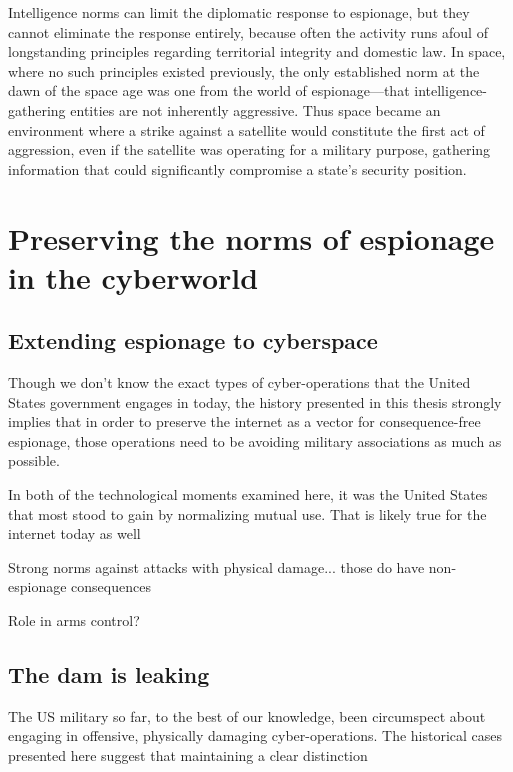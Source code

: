 \documentclass{memoir}
\begin{document}
Intelligence norms can limit the diplomatic response to espionage, but they cannot eliminate the response entirely, because often the activity runs afoul of longstanding principles regarding territorial integrity and domestic law. In space, where no such principles existed previously, the only established norm at the dawn of the space age was one from the world of espionage---that intelligence-gathering entities are not inherently aggressive. Thus space became an environment where a strike against a satellite would constitute the first act of aggression, even if the satellite was operating for a military purpose, gathering information that could significantly compromise a state's security position.



\section{Preserving the norms of espionage in the cyberworld}
\subsection{Extending espionage to cyberspace}
Though we don't know the exact types of cyber-operations that the United States government engages in today, the history presented in this thesis strongly implies that in order to preserve the internet as a vector for consequence-free espionage, those operations need to be avoiding military associations as much as possible.

In both of the technological moments examined here, it was the United States that most stood to gain by normalizing mutual use. That is likely true for the internet today as well

Strong norms against attacks with physical damage... those do have non-espionage consequences

Role in arms control?

\subsection{The dam is leaking}
The US military so far, to the best of our knowledge, been circumspect about engaging in offensive, physically damaging cyber-operations. The historical cases presented here suggest that maintaining a clear distinction
\end{document}
